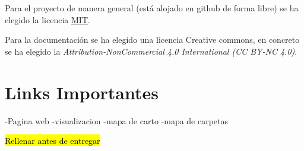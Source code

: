 
Para el proyecto de manera general (está alojado en github de forma libre) se ha elegido la licencia  \href{https://github.com/aguadotzn/TFM_MUINBDES/blob/master/LICENSE}{MIT}.

Para la documentación se ha elegido una licencia Creative commons, en concreto se ha elegido la \emph{Attribution-NonCommercial 4.0 International (CC BY-NC 4.0)}.

\label{commons}


\section{Links Importantes}\label{links_final}

-Pagina web
-visualizacion
-mapa de carto
-mapa de carpetas

 \hl{Rellenar antes de entregar}



